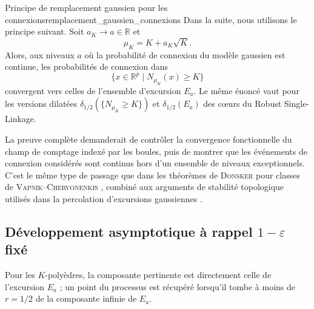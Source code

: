 \begin{Resultat}{Principe de remplacement gaussien pour les connexions}{remplacement_gaussien_connexions}
Dans la suite, nous utilisons le principe suivant. Soit $a_K\to a\in\mathbb R$ et
\[
    \mu_K=K+a_K\sqrt K.
\]
Alors, aux niveaux $a$ où la probabilité de connexion du modèle gaussien est continue, les probabilités de connexion dans
\[
    \{x \in \mathbb R^p \mid N_{\mu_K}(x)\ge K\}
\]
convergent vers celles de l'ensemble d'excursion $E_a$. Le même énoncé vaut pour les versions dilatées $\delta_{1/2}(\{N_{\mu_K}\ge K\})$ et $\delta_{1/2}(E_a)$ des cœurs du Robust Single-Linkage.
\end{Resultat}

\begin{Preuve}[Commentaire]
La preuve complète demanderait de contrôler la convergence fonctionnelle du champ de comptage indexé par les boules, puis de montrer que les événements de connexion considérés sont continus hors d'un ensemble de niveaux exceptionnels. C'est le même type de passage que dans les théorèmes de \textsc{Donsker} pour classes de \textsc{Vapnik--Chervonenkis} \cite{VanDerVaartWellner1996}, combiné aux arguments de stabilité topologique utilisés dans la percolation d'excursions gaussiennes \cite{RiveraVanneuville2020, MuirheadVanneuville2020, MuirheadRiveraVanneuville2023, Severo2022}.
\end{Preuve}


\subsection{Développement asymptotique à rappel $1-\varepsilon$ fixé}

Pour les $K$-polyèdres, la composante pertinente est directement celle de l'excursion $E_a$ ; un point du processus est récupéré lorsqu'il tombe à moins de $r=1/2$ de la composante infinie de $E_a$.

